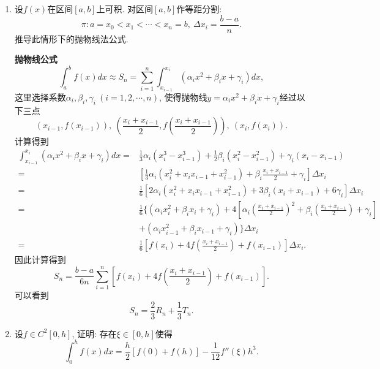 \documentclass[UTF8,11pt, a4paper, oneside, fontset=none]{ctexbook}
\begin{document}
\begin{enumerate}
\begin{proof}
左边的不等式则利用离散形式的C-S不等式:
\[
\sqrt{a^2 \sin^2 t + b^2 \cos^2 t} = \sqrt{a^2 \sin^2 t + b^2 \cos^2 t} \cdot \sqrt{\sin^2 t + \cos^2 t} 
\]
\[
\geq a \sin t \cdot \sin t + b \cos t \cdot \cos t = a \sin^2 t + b \cos^2 t,
\]
对两边积分再乘4得到积分下界:
\[
s \geq 4 \int_0^{\frac{\pi}{2}} (a \sin^2 t + b \cos^2 t)dt = \pi (a + b).
\]


\end{proof}



\item 设$f(x)$在区间$[a, b]$上可积. 对区间$[a, b]$作等距分割: 
\[
\pi: a = x_0 < x_1 < \cdots < x_n = b, \ \Delta x_i = \frac{b-a}{n}. 
\]
推导此情形下的抛物线法公式.


{\bf 抛物线公式}
\[
\int_a^b f(x) dx \approx S_n = \sum_{i=1}^n \int_{x_{i-1}}^{x_i} (\alpha_i x^2 + \beta_i x + \gamma_i) dx,
\]
这里选择系数$\alpha_i, \beta_i, \gamma_i \ (i = 1, 2, \cdots, n)$, 使得抛物线$y = \alpha_i x^2 + \beta_i x + \gamma_i$经过以下三点
\[
(x_{i-1}, f(x_{i-1})), \ \left( \frac{x_i + x_{i-1}}{2}, f \left(  \frac{x_i + x_{i-1}}{2} \right) \right), \ (x_i, f(x_i)).
\]
计算得到
\begin{align*}
\int_{x_{i-1}}^{x_i} (\alpha_i x^2 + \beta_i x + \gamma_i) dx  = & \frac{1}{3} \alpha_i (x_i^3 - x_{i-1}^3) + \frac{1}{2} \beta_i (x_i^2 - x_{i-1}^2) + \gamma_i (x_i - x_{i-1}) \\
 = & \left[ \frac{1}{3} \alpha_i (x_i^2 + x_i x_{i-1} + x_{i-1}^2) + \beta_i \frac{x_i + x_{i-1}}{2} + \gamma_i \right] \Delta x_i\\
 = & \frac{1}{6} \left[ 2 \alpha_i (x_i^2 + x_i x_{i-1} + x_{i-1}^2) + 3 \beta_i (x_i + x_{i-1}) + 6 \gamma_i \right] \Delta x_i\\
 = &  \frac{1}{6} \{ (\alpha_i x_i^2 + \beta_i x_i + \gamma_i) + 4 \left[ \alpha_i  \left(  \frac{x_i + x_{i-1}}{2} \right)^2 + \beta_i  \left(  \frac{x_i + x_{i-1}}{2} \right) + \gamma_i \right] \\
& + (\alpha_i x_{i-1}^2 + \beta_i x_{i-1} + \gamma_i) \} \Delta x_i \\
 = & \frac{1}{6} \left[ f(x_i) + 4 f \left(  \frac{x_i + x_{i-1}}{2} \right) + f(x_{i-1}) \right] \Delta x_i.
\end{align*}
因此计算得到
\[
S_n = \frac{b-a}{6n} \sum_{i=1}^n \left[ f(x_i) + 4 f \left(  \frac{x_i + x_{i-1}}{2} \right) + f(x_{i-1}) \right].
\]
可以看到
\[
S_n = \frac{2}{3} R_n + \frac{1}{3} T_n.
\]



\item 设$f \in C^2[0, h]$, 证明: 存在$\xi \in [0, h]$使得
\[
\int_0^h f(x) dx = \frac{h}{2} [f(0) + f(h)] - \frac{1}{12} f''(\xi) h^3. 
\]



\end{enumerate}
\end{document}
